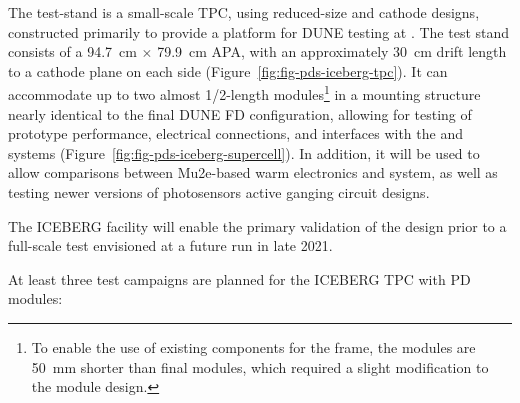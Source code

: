 The  test-stand is a small-scale TPC, using reduced-size   and cathode designs, constructed primarily to provide a platform for DUNE  testing at . 
The test stand consists of a \SI{94.7}{cm} $\times$ \SI{79.9}{cm} APA, with an approximately \SI{30}{cm} drift length to a cathode plane on each side (Figure~\ref{fig:fig-pds-iceberg-tpc}).  
It can accommodate up to two almost 1/2-length  modules\footnote{To enable the use of existing components for the  frame, the  modules are \SI{50}{mm} shorter than final modules, which required a slight modification to the  module design.} in a mounting structure nearly identical to the final DUNE FD configuration, allowing for testing of  prototype performance, electrical connections, and interfaces with the  and  systems (Figure~\ref{fig:fig-pds-iceberg-supercell}). 
In addition, it will be used to allow comparisons between Mu2e-based warm electronics and   system, as well as testing newer versions of photosensors active ganging circuit designs.

The ICEBERG facility will enable the primary validation of the  design prior to a full-scale test envisioned at a future  run in late 2021. 

At least three test campaigns are planned for the ICEBERG TPC with PD modules:  

